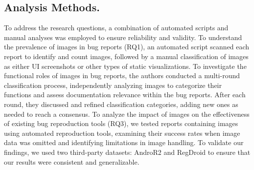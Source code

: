 



\subsection{Analysis Methods.}
To address the research questions, a combination of automated scripts and manual analyses was employed to ensure reliability and validity. 
%
To understand the prevalence of images in bug reports (RQ1), an automated script scanned each report to identify and count images, followed by a manual classification of images as either UI screenshots or other types of static visualizations. 
%
To investigate the functional roles of images in bug reports, the authors conducted a multi-round classification process, independently analyzing images to categorize their functions and assess documentation relevance within the bug reports. After each round, they discussed and refined classification categories, adding new ones as needed to reach a consensus.
%
To analyze the impact of images on the effectiveness of existing bug reproduction tools (RQ3), we tested reports containing images using automated reproduction tools, examining their success rates when image data was omitted and identifying limitations in image handling.
%
To validate our findings, we used two third-party datasets: AndroR2\cite{wendland2021andror2, johnson2022empirical} and RegDroid\cite{xiong2023empirical}
to ensure that our results were consistent and generalizable.
%

